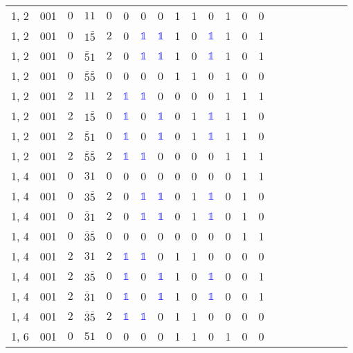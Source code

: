 \begin{longtable*}{c| cccccccccccccccccccc }
1, 2& 001& $0$& $11$& $0$& 0& 0& 0& 1& 1& 0& 1& 0& 0\\
1, 2& 001& $0$& $1\bar{5}$& $2$& 0& \textcolor{blue}{$\mathds{1}$}& \textcolor{blue}{$\mathds{1}$}& 1& 0& \textcolor{blue}{$\mathds{1}$}& 1& 0& 1\\
1, 2& 001& $0$& $\bar{5}1$& $2$& 0& \textcolor{blue}{$\mathds{1}$}& \textcolor{blue}{$\mathds{1}$}& 1& 0& \textcolor{blue}{$\mathds{1}$}& 1& 0& 1\\
1, 2& 001& $0$& $\bar{5}\bar{5}$& $0$& 0& 0& 0& 1& 1& 0& 1& 0& 0\\
1, 2& 001& $2$& $11$& $2$& \textcolor{blue}{$\mathds{1}$}& \textcolor{blue}{$\mathds{1}$}& 0& 0& 0& 0& 1& 1& 1\\
1, 2& 001& $2$& $1\bar{5}$& $0$& \textcolor{blue}{$\mathds{1}$}& 0& \textcolor{blue}{$\mathds{1}$}& 0& 1& \textcolor{blue}{$\mathds{1}$}& 1& 1& 0\\
1, 2& 001& $2$& $\bar{5}1$& $0$& \textcolor{blue}{$\mathds{1}$}& 0& \textcolor{blue}{$\mathds{1}$}& 0& 1& \textcolor{blue}{$\mathds{1}$}& 1& 1& 0\\
1, 2& 001& $2$& $\bar{5}\bar{5}$& $2$& \textcolor{blue}{$\mathds{1}$}& \textcolor{blue}{$\mathds{1}$}& 0& 0& 0& 0& 1& 1& 1\\
1, 4& 001& $0$& $31$& $0$& 0& 0& 0& 0& 0& 0& 0& 1& 1\\
1, 4& 001& $0$& $3\bar{5}$& $2$& 0& \textcolor{blue}{$\mathds{1}$}& \textcolor{blue}{$\mathds{1}$}& 0& 1& \textcolor{blue}{$\mathds{1}$}& 0& 1& 0\\
1, 4& 001& $0$& $\bar{3}1$& $2$& 0& \textcolor{blue}{$\mathds{1}$}& \textcolor{blue}{$\mathds{1}$}& 0& 1& \textcolor{blue}{$\mathds{1}$}& 0& 1& 0\\
1, 4& 001& $0$& $\bar{3}\bar{5}$& $0$& 0& 0& 0& 0& 0& 0& 0& 1& 1\\
1, 4& 001& $2$& $31$& $2$& \textcolor{blue}{$\mathds{1}$}& \textcolor{blue}{$\mathds{1}$}& 0& 1& 1& 0& 0& 0& 0\\
1, 4& 001& $2$& $3\bar{5}$& $0$& \textcolor{blue}{$\mathds{1}$}& 0& \textcolor{blue}{$\mathds{1}$}& 1& 0& \textcolor{blue}{$\mathds{1}$}& 0& 0& 1\\
1, 4& 001& $2$& $\bar{3}1$& $0$& \textcolor{blue}{$\mathds{1}$}& 0& \textcolor{blue}{$\mathds{1}$}& 1& 0& \textcolor{blue}{$\mathds{1}$}& 0& 0& 1\\
1, 4& 001& $2$& $\bar{3}\bar{5}$& $2$& \textcolor{blue}{$\mathds{1}$}& \textcolor{blue}{$\mathds{1}$}& 0& 1& 1& 0& 0& 0& 0\\
1, 6& 001& $0$& $51$& $0$& 0& 0& 0& 1& 1& 0& 1& 0& 0\\

\end{longtable*}
